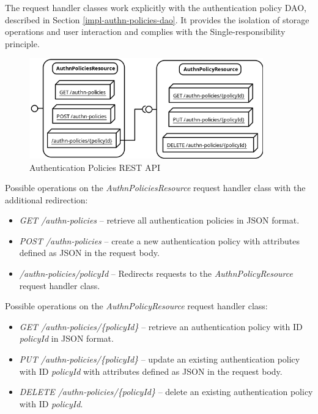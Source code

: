 The request handler classes work explicitly with the authentication policy DAO, described in Section \ref{impl-authn-policies-dao}.
It provides the isolation of storage operations and user interaction and complies with the Single-responsibility principle.\cite{impl-single-responsibility}

\begin{figure}[htbp]
  \centering
  \includegraphics[width=0.9\textwidth]{img/sections/6-implementation/rest.png}
  \caption{Authentication Policies REST API}
  \label{fig:impl-authn-policies-rest}
\end{figure}

Possible operations on the \textit{AuthnPoliciesResource} request handler class with the additional redirection:
\begin{itemize}
    \item \textit{GET /authn-policies} -- retrieve all authentication policies in JSON format. 
    \item \textit{POST /authn-policies} -- create a new authentication policy with attributes defined as JSON in the request body.  
    \item \textit{/authn-policies/{policyId}} -- Redirects requests to the \textit{AuthnPolicyResource} request handler class.
\end{itemize}

Possible operations on the \textit{AuthnPolicyResource} request handler class:

\begin{itemize}
    \item \textit{GET /authn-policies/\{policyId\}} -- retrieve an authentication policy with ID \textit{policyId} in JSON format.
    \item \textit{PUT /authn-policies/\{policyId\}} -- update an existing authentication policy with ID \textit{policyId} with attributes defined as JSON in the request body.
    \item \textit{DELETE /authn-policies/\{policyId\}} -- delete an existing authentication policy with ID \textit{policyId}.
\end{itemize}

